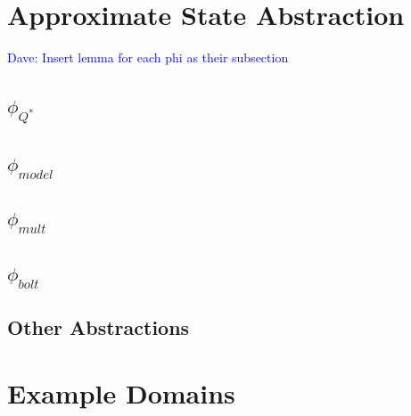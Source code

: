 \documentclass{article}
\newcommand\dnote[1]{\textcolor{blue}{Dave: #1}}
\begin{document}







\section{Approximate State Abstraction}




\dnote{Insert lemma for each phi as their subsection}


\subsection{$\phi_{Q^*}$}

\subsection{$\phi_{model}$}

\subsection{$\phi_{mult}$}

\subsection{$\phi_{bolt}$}

\subsection{Other Abstractions}





\section{Example Domains}
\end{document}
